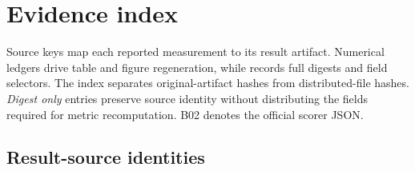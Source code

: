 \section{Evidence index}
\label{app:evidence}
Source keys map each reported measurement to its result artifact. Numerical ledgers drive table and figure regeneration, while  records full digests and field selectors. The index separates original-artifact hashes from distributed-file hashes. \emph{Digest only} entries preserve source identity without distributing the fields required for metric recomputation. B02 denotes the official scorer JSON.
\subsection{Result-source identities}
\begingroup\footnotesize
\setlength{\tabcolsep}{3pt}
\renewcommand{\arraystretch}{1.08}
